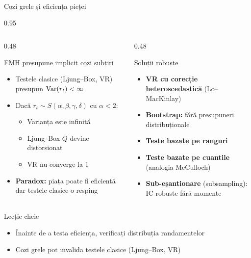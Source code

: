 \documentclass[9pt, aspectratio=169, t]{beamer}
\begin{document}
\begin{frame}[shrink=15]{Cozi grele și eficiența pieței}
\begin{cminipage}{0.95\textwidth}
\begin{columns}[T]
\begin{column}{0.48\textwidth}
\begin{block}{EMH presupune implicit cozi subțiri}
\begin{itemize}\setlength{\itemsep}{0pt}
    \item Testele clasice (Ljung--Box, VR) presupun $\text{Var}(r_t) < \infty$
    \item Dacă $r_t \sim S(\alpha, \beta, \gamma, \delta)$ cu $\alpha < 2$:
    \begin{itemize}\setlength{\itemsep}{0pt}
        \item Varianța este infinită
        \item Ljung--Box $Q$ devine distorsionat
        \item VR nu converge la 1
    \end{itemize}
    \item \textbf{Paradox:} piața poate fi eficientă dar testele clasice o resping
\end{itemize}
\end{block}
\end{column}
\begin{column}{0.48\textwidth}
\begin{block}{Soluții robuste}
\begin{itemize}\setlength{\itemsep}{0pt}
    \item \textbf{VR cu corecție heteroscedastică} (Lo--MacKinlay)
    \item \textbf{Bootstrap:} fără presupuneri distribuționale
    \item \textbf{Teste bazate pe ranguri}
    \item \textbf{Teste bazate pe cuantile} (analogia McCulloch)
    \item \textbf{Sub-eșantionare} (subsampling): IC robuste fără momente
\end{itemize}
\end{block}
\end{column}
\end{columns}

\vspace{0.2cm}
\begin{alertblock}{Lecție cheie}
\begin{itemize}\setlength{\itemsep}{0pt}
    \item Înainte de a testa eficiența, verificați distribuția randamentelor
    \item Cozi grele pot invalida testele clasice (Ljung--Box, VR)
\end{itemize}
\end{alertblock}
\end{cminipage}
\end{frame}
\end{document}
